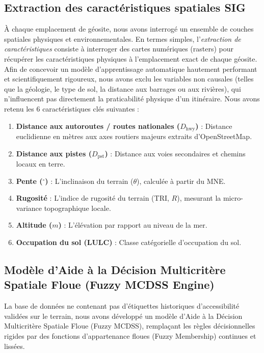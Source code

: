 \documentclass[11pt,twocolumn,a4paper]{article}
\begin{document}
\subsection{Extraction des caractéristiques spatiales SIG}
À chaque emplacement de géosite, nous avons interrogé un ensemble de couches spatiales physiques et environnementales. En termes simples, l'\textit{extraction de caractéristiques} consiste à interroger des cartes numériques (rasters) pour récupérer les caractéristiques physiques à l'emplacement exact de chaque géosite. Afin de concevoir un modèle d'apprentissage automatique hautement performant et scientifiquement rigoureux, nous avons exclu les variables non causales (telles que la géologie, le type de sol, la distance aux barrages ou aux rivières), qui n'influencent pas directement la praticabilité physique d'un itinéraire. Nous avons retenu les 6 caractéristiques clés suivantes :
\begin{enumerate}
    \item \textbf{Distance aux autoroutes / routes nationales ($D_{\text{hwy}}$)} : Distance euclidienne en mètres aux axes routiers majeurs extraits d'OpenStreetMap.
    \item \textbf{Distance aux pistes ($D_{\text{pst}}$)} : Distance aux voies secondaires et chemins locaux en terre.
    \item \textbf{Pente ($^\circ$)} : L'inclinaison du terrain ($\theta$), calculée à partir du MNE.
    \item \textbf{Rugosité} : L'indice de rugosité du terrain (TRI, $R$), mesurant la micro-variance topographique locale.
    \item \textbf{Altitude ($m$)} : L'élévation par rapport au niveau de la mer.
    \item \textbf{Occupation du sol (LULC)} : Classe catégorielle d'occupation du sol.
\end{enumerate}

\subsection{Modèle d'Aide à la Décision Multicritère Spatiale Floue (Fuzzy MCDSS Engine)}
La base de données ne contenant pas d'étiquettes historiques d'accessibilité validées sur le terrain, nous avons développé un modèle d'Aide à la Décision Multicritère Spatiale Floue (Fuzzy MCDSS), remplaçant les règles décisionnelles rigides par des fonctions d'appartenance floues (Fuzzy Membership) continues et lissées.
\end{document}
